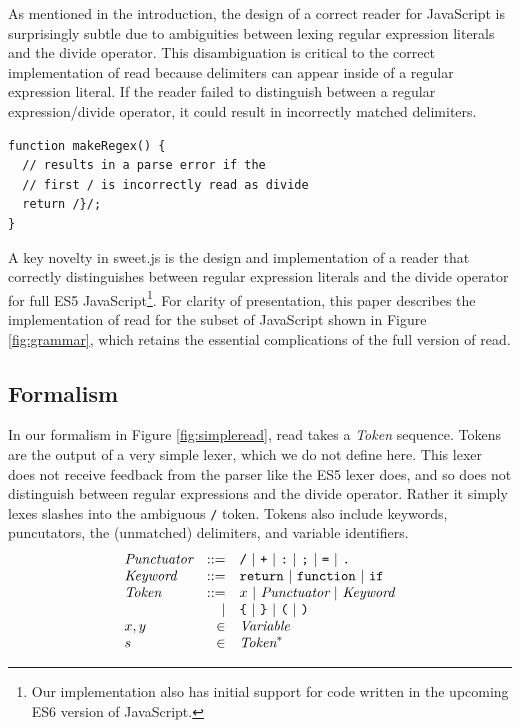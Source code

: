 \documentclass[9pt]{sigplanconf}
\begin{document}
As mentioned in the introduction, the design of a correct reader for JavaScript is surprisingly subtle due to ambiguities between lexing regular expression literals and the divide operator. This disambiguation is critical to the correct implementation of read because delimiters can appear inside of a regular expression literal. If the reader failed to distinguish between a regular expression/divide operator, it could result in incorrectly matched delimiters. 
\begin{lstlisting}
function makeRegex() {
  // results in a parse error if the
  // first / is incorrectly read as divide
  return /}/;
}
\end{lstlisting}

A key novelty in sweet.js is the design and implementation of a reader
that correctly distinguishes between regular expression literals and
the divide operator for full ES5 JavaScript\footnote{Our
  implementation also has initial support for code written in the
  upcoming ES6 version of JavaScript.}. For clarity of presentation,
this paper describes the implementation of read for the subset of
JavaScript shown in Figure \ref{fig:grammar}, which retains the
essential complications of the full version of read.

\subsection{Formalism}

In our formalism in Figure \ref{fig:simpleread}, read takes a \textit{Token} sequence. Tokens are the output of a very simple lexer, which we do not define here. This lexer does not receive feedback from the parser like the ES5 lexer does, and so does not distinguish between regular expressions and the divide operator. Rather it simply lexes slashes into the ambiguous \texttt{/} token. Tokens also include keywords, puncutators, the (unmatched) delimiters, and variable identifiers.
\[
\begin{array}{lrl}
  \textit{Punctuator} &::=& \texttt{/} ~|~ \texttt{+} ~|~ \texttt{:} ~|~
  \texttt{;} ~|~ \texttt{=} ~|~ \texttt{.}
  \\
  \textit{Keyword} &::=& \texttt{return} ~|~ \texttt{function}~|~ \texttt{if}
  \\
  \textit{Token} &::=& x ~|~ \textit{Punctuator} ~|~ \textit{Keyword}
  \\
  &|& 
  \texttt{\{} ~|~ 
  \texttt {\}} ~|~  
  \texttt{(} ~|~ 
  \texttt{)}
  \\
  x, y &\in& \textit{Variable}
  \\
  s &\in& \textit{Token}^{*}
 \end{array}
\]
\end{document}
